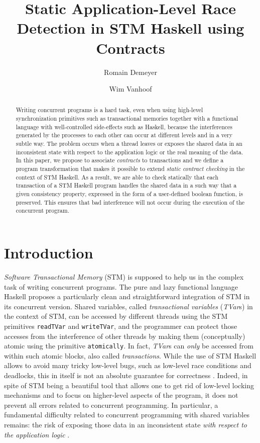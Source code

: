 \documentclass[submission,copyright,creativecommons]{eptcs}
\title{Static Application-Level Race Detection in STM Haskell using Contracts}
\author{Romain Demeyer
\institute{University of Namur, Belgium}
\email{romain.demeyer@unamur.be} 
\and
Wim Vanhoof
\institute{University of Namur, Belgium}
\email{wim.vanhoof@unamur.be}}
\begin{document}
\maketitle

\begin{abstract} 
Writing concurrent programs is a hard task, even when using high-level synchronization primitives such as transactional memories together with a functional language with well-controlled side-effects such as Haskell, because the interferences generated by the processes to each other can occur at different levels and in a very subtle way. 
The problem occurs when a thread leaves or exposes the shared data in an inconsistent state with respect to the application logic or the real meaning of the data.  
In this paper, we propose to associate {\em contracts} to transactions and we define a program transformation that makes it possible to extend \emph{static contract checking} in the context of STM Haskell.  
As a result, we are able to check statically that each transaction of a STM Haskell program handles the shared data in a such way that a given consistency property, expressed in the form of a user-defined boolean function, is preserved. 
This ensures that bad interference will not occur during the execution of the concurrent program. 
\end{abstract}

\section{Introduction}
\label{introduction}

\emph{Software Transactional Memory} (STM) \cite{software-transactional-memory} is supposed to help us in the complex task of writing concurrent programs. 
The pure and lazy functional language Haskell proposes a particularly clean and straightforward integration of STM \cite{beautiful-concurrency,transactional-memory-data,composable-memory-transactions} in its concurrent version. 
Shared variables, called \emph{transactional variables} (\emph{TVar}s) in the context of STM, can be accessed by different threads using the STM primitives \texttt{readTVar} and \texttt{writeTVar}, and the programmer can protect those accesses from the interference of other threads by making them (conceptually) atomic using the primitive \texttt{atomically}.
In fact, \emph{TVar}s can \emph{only} be accessed from within such atomic blocks, also called \emph{transactions}.
While the use of STM Haskell  allows to avoid many tricky low-level bugs, such as low-level race conditions and deadlocks, this in itself is not an absolute guarantee for correctness \cite{beautiful-concurrency}. Indeed, in spite of STM being a beautiful tool that allows one to get rid of low-level locking mechanisms and to focus on higher-level aspects of the program, it does not prevent all errors related to concurrent programming. In particular, a fundamental difficulty related to concurrent programming with shared variables remains: the risk of exposing those data in an inconsistent state \emph{with respect to the application logic} \cite{verifying-correct-usage}.
\end{document}
